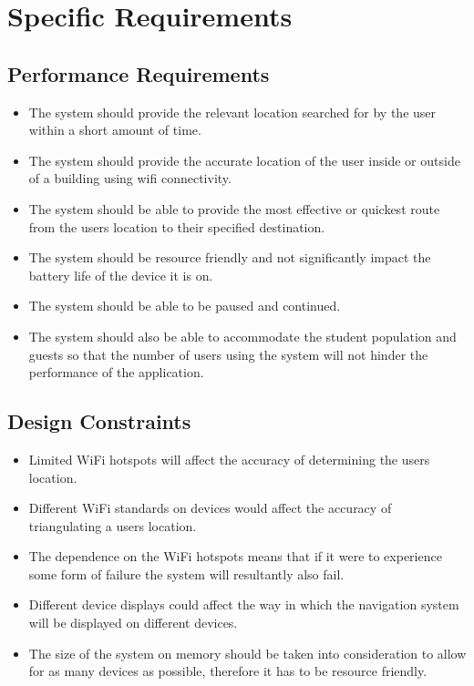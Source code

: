 \documentclass[a4paper,12pt]{article}
\begin{document}
	\newpage
	\section{Specific Requirements}
	\subsection{Performance Requirements}
			\begin{itemize}
			\small
			\item The system should provide the relevant location searched for by the user within a short amount of time.
			\item The system should provide the accurate location of the user inside or outside of a building using wifi connectivity.
			\item The system should be able to provide the most effective or quickest route from the users location to their specified destination.
			\item The system should be resource friendly and not significantly impact the battery life of the device it is on.
			\item The system should be able to be paused and continued.
			\item The system should also be able to accommodate the student population and guests so that the number of users using the system will not hinder the performance of the application.
		\end{itemize}
	\subsection{Design Constraints}
		\begin{itemize}
			\small
			\item Limited WiFi hotspots will affect the accuracy of determining the users location.
			\item Different WiFi standards on devices would affect the accuracy of triangulating a users location.
			\item The dependence on the WiFi hotspots means that if it were to experience some form of failure the system will resultantly also fail.
			\item Different device displays could affect the way in which the navigation system will be displayed on different devices.
			\item The size of the system on memory should be taken into consideration to allow for as many devices as possible, therefore it has to be resource friendly.
		\end{itemize}
\end{document}
